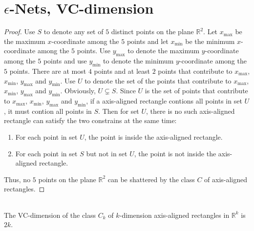 \section{$\epsilon$-Nets, VC-dimension}
\noindent {}
\begin{proof}
    Use $S$ to denote any set of $5$ distinct points on the plane $\mathbb{R}^2$. 
    Let $x_{\max}$ be the maximum $x$-coordinate among the $5$ points and 
    let $x_{\min}$ be the minimum $x$-coordinate among the $5$ points.
    Use $y_{\max}$ to denote the maximum $y$-coordinate among the $5$ points and
    use $y_{\min}$ to denote the minimum $y$-coordinate among the $5$ points.
    There are at most $4$ points and at least $2$ points that contribute to  $x_{\max}$, $x_{\min}$, $y_{\max}$ and $y_{\min}$.
    Use $U$ to denote the set of the points that contribute to  $x_{\max}$, $x_{\min}$, $y_{\max}$ and $y_{\min}$.
    Obviously, $U\subsetneq S$. 
    Since $U$ is the set of points that contribute to  $x_{\max}$, $x_{\min}$, $y_{\max}$ and $y_{\min}$,
    if a axis-aligned rectangle contions all points in set $U$, it must contion all points in $S$.
    Then for set $U$, there is no such axis-aligned rectangle can satisfy the two constrains at the same time:
    \begin{enumerate}
        \item For each point in set $U$, the point is inside the axis-aligned rectangle.
        \item  For each point in set $S$ but not in set $U$, the point is not inside the axis-aligned rectangle.
    \end{enumerate}

    Thus, no $5$ points on the plane $\mathbb{R}^2$ can be shattered by the class $C$ of axis-aligned
    rectangles.
\end{proof}
\noindent {}\\
The VC-dimension of the class $C_k$ of $k$-dimension axis-aligned rectangles in $\mathbb{R}^k$ is $2k$.
